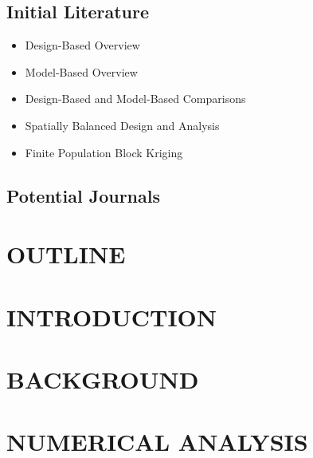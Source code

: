 \subsection*{Initial Literature}

\begin{itemize}
  \item Design-Based Overview \citep{Sarndal2003model, Lohr2009sampling}
  \item Model-Based Overview \citep{Cressie2015statistics, Schabenberger2017statistical}
  \item Design-Based and Model-Based Comparisons \citep{Hansen1983evaluation, Brus1997random, VerHoef2002sampling, Cooper2006sampling, sterba2009alternative, Brus2020statistical, Chan2020bayesian}
  \item Spatially Balanced Design and Analysis \citep{StevensOlsen2003VarianceEstimation, StevensOlsen2004GRTS}
  \item Finite Population Block Kriging \citep{VerHoef2002sampling, VerHoef2008spatial, Higham2020adjusting}
\end{itemize}

\subsection*{Potential Journals}


\section*{\centering OUTLINE}

\section{\centering INTRODUCTION}

\section{\centering BACKGROUND}


\section{\centering NUMERICAL ANALYSIS}

